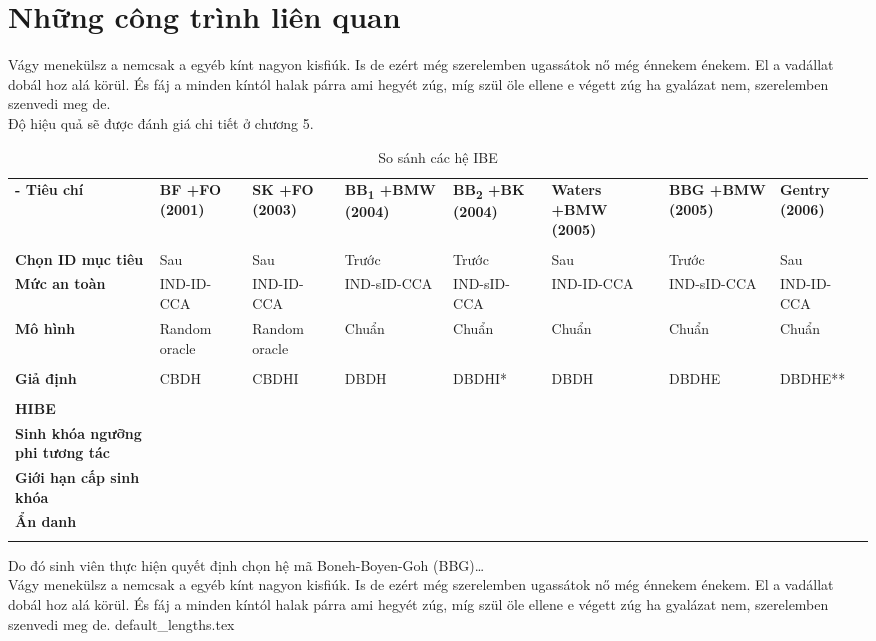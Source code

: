 \documentclass[class=report, crop=false]{standalone}
\begin{document}
	\section{Những công trình liên quan}
		Vágy menekülsz a nemcsak a egyéb kínt nagyon kisfiúk. Is de ezért még szerelemben ugassátok nő még énnekem énekem. El a vadállat dobál hoz alá körül. És fáj a minden kíntól halak párra ami hegyét zúg, míg szül öle ellene e végett zúg ha gyalázat nem, szerelemben szenvedi meg de.\\[\baselineskip]
		Độ hiệu quả sẽ được đánh giá chi tiết ở chương 5.
		\newpage
		\small
		\begin{longtabu}{| >{\bfseries\centering}p{2cm} | X[c] | X[c] | X[c] | X[c] | X[c] | X[c] | X[c] |}
			\tabucline[1pt]-
			\everyrow{\tabucline[1pt]-}
			Tiêu chí &
			\bfseries BF +FO (2001) &
			\bfseries SK +FO (2003) &
			\bfseries BB\textsubscript{1} +BMW (2004) &
			\bfseries BB\textsubscript{2} +BK (2004) &
			\bfseries Waters +BMW (2005) &
			\bfseries BBG +BMW (2005) &
			\bfseries Gentry \newline\newline (2006) \\
			 \\
			Chọn ID mục tiêu & Sau & Sau & Trước & Trước & Sau & Trước & Sau \\
			Mức an toàn & IND-ID-CCA & IND-ID-CCA & IND-sID-CCA & IND-sID-CCA & IND-ID-CCA & IND-sID-CCA & IND-ID-CCA \\
			Mô hình & Random oracle & Random oracle & Chuẩn & Chuẩn & Chuẩn & Chuẩn & Chuẩn \\
			 \\
			Giả định & CBDH & CBDHI & DBDH & DBDHI* & DBDH & DBDHE & DBDHE** \\
			 \\
			HIBE & \checkmark & & \checkmark & & \checkmark & \checkmark & \\
			Sinh khóa ngưỡng phi tương tác & \checkmark & & \checkmark & & \checkmark & \checkmark & \\
			Giới hạn cấp sinh khóa & & & & & & \checkmark & \\
			Ẩn danh & & & & & & & \checkmark \\
			\everyrow{}
			\caption{So sánh các hệ IBE}
		\end{longtabu}
		\normalsize
		Do đó sinh viên thực hiện quyết định chọn hệ mã Boneh-Boyen-Goh (BBG)\dots \\[\baselineskip]
		Vágy menekülsz a nemcsak a egyéb kínt nagyon kisfiúk. Is de ezért még szerelemben ugassátok nő még énnekem énekem. El a vadállat dobál hoz alá körül. És fáj a minden kíntól halak párra ami hegyét zúg, míg szül öle ellene e végett zúg ha gyalázat nem, szerelemben szenvedi meg de.
	\newpage	
	{default_lengths.tex}
\end{document}
